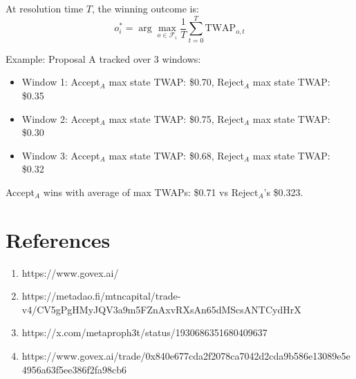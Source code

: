\documentclass{article}
\begin{document}
\begin{itemize}
        At resolution time $T$, the winning outcome is:
        \begin{equation}
        o_i^* = \arg\max_{o \in \mathcal{F}_i} \frac{1}{T} \sum_{t=0}^{T} \text{TWAP}_{o,t}
        \end{equation}
        
        Example: Proposal A tracked over 3 windows:
        \begin{itemize}
            \item Window 1: Accept$_A$ max state TWAP: \$0.70, Reject$_A$ max state TWAP: \$0.35
            \item Window 2: Accept$_A$ max state TWAP: \$0.75, Reject$_A$ max state TWAP: \$0.30  
            \item Window 3: Accept$_A$ max state TWAP: \$0.68, Reject$_A$ max state TWAP: \$0.32
        \end{itemize}
        Accept$_A$ wins with average of max TWAPs: \$0.71 vs Reject$_A$'s \$0.323.
        \end{itemize}
\section{References}
\begin{enumerate}
   \item https://www.govex.ai/
   \item https://metadao.fi/mtncapital/trade-v4/CV5gPgHMyJQV3a9m5FZnAxvRXsAn65dMScsANTCydHrX
   \item https://x.com/metaproph3t/status/1930686351680409637
   \item https://www.govex.ai/trade/0x840e677cda2f2078ca7042d2cda9b586e13089e5e4956a63f5ee386f2fa98cb6
\end{enumerate}
\end{document}
